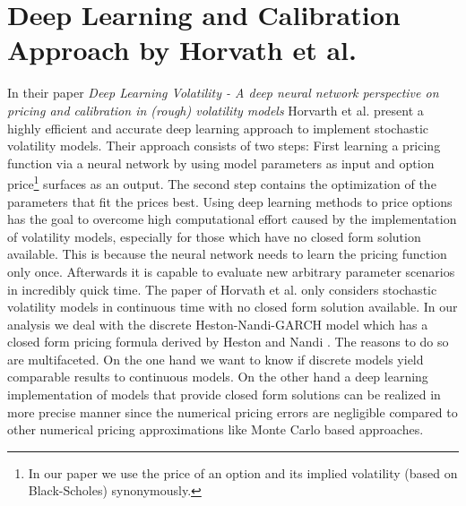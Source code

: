 \documentclass{article}
\begin{document}
\section{Deep Learning and Calibration Approach by Horvath et al.\cite{Blanka}}
In their paper \textit{Deep Learning Volatility - A deep neural network perspective on pricing and calibration in (rough) volatility models} Horvarth et al. \cite{Blanka} present a highly efficient and accurate deep learning approach to implement stochastic volatility models. Their approach consists of two steps: First learning a pricing function via a neural network by using model parameters as input and option price\footnote{In our paper we use the price of an option and its implied volatility (based on Black-Scholes) synonymously.} surfaces as an output. The second step contains the optimization of the parameters that fit the prices best. \newline
Using deep learning methods to price options has the goal to overcome high computational effort caused by the implementation of volatility models, especially for those which have no closed form solution available. This is because the neural network needs to learn the pricing function only once. Afterwards it is capable to evaluate new arbitrary parameter scenarios in incredibly quick time. 
\newline
The paper of Horvath et al. \cite{Blanka} only considers stochastic volatility models in continuous time with no closed form solution available. In our analysis we deal with the discrete Heston-Nandi-GARCH model which has a closed form pricing formula derived by Heston and Nandi \cite{HestonNandi}. The reasons to do so are multifaceted. On the one hand we want to know if discrete models yield comparable results to continuous models. On the other hand a deep learning implementation of models that provide closed form solutions can be realized in more precise manner since the numerical pricing errors are negligible compared to other numerical pricing approximations like Monte Carlo based approaches. 
\end{document}
